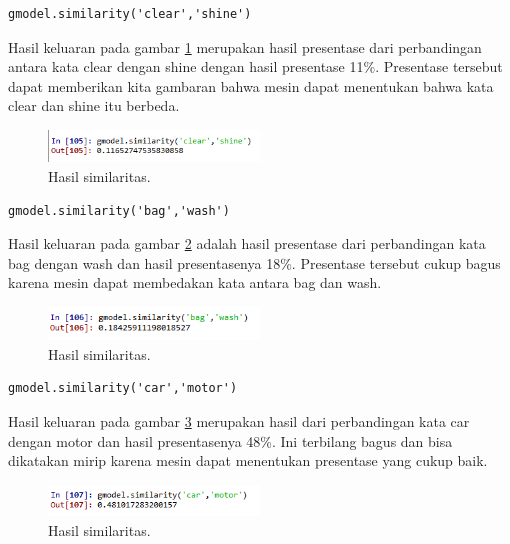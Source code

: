 \begin{enumerate}
\begin{verbatim}
gmodel.similarity('clear','shine')
\end{verbatim}
Hasil keluaran pada gambar \ref{sim5} merupakan hasil presentase dari perbandingan antara kata clear dengan shine dengan hasil presentase 11\%. Presentase tersebut dapat memberikan kita gambaran bahwa mesin dapat menentukan bahwa kata clear dan shine itu berbeda.
		\begin{figure}[!htbp]
		\centerline{\includegraphics[width=0.5\textwidth]{figures/im/sim5.png}}
		\caption{Hasil similaritas.}
		\label{sim5}
		\end{figure}

\begin{verbatim}
gmodel.similarity('bag','wash')
\end{verbatim}
Hasil keluaran pada gambar \ref{sim6} adalah hasil presentase dari perbandingan kata bag dengan wash dan hasil presentasenya 18\%. Presentase tersebut cukup bagus karena mesin dapat membedakan kata antara bag dan wash.
		\begin{figure}[!htbp]
		\centerline{\includegraphics[width=0.5\textwidth]{figures/im/sim6.png}}
		\caption{Hasil similaritas.}
		\label{sim6}
		\end{figure}

\begin{verbatim}
gmodel.similarity('car','motor')
\end{verbatim}
Hasil keluaran pada gambar \ref{sim7} merupakan hasil dari perbandingan kata car dengan motor dan hasil presentasenya 48\%. Ini terbilang bagus dan bisa dikatakan mirip karena mesin dapat menentukan presentase yang cukup baik.
		\begin{figure}[!htbp]
		\centerline{\includegraphics[width=0.5\textwidth]{figures/im/sim7.png}}
		\caption{Hasil similaritas.}
		\label{sim7}
		\end{figure}


\end{enumerate}
